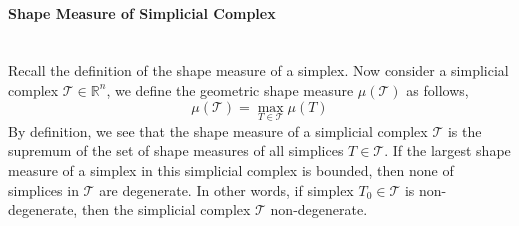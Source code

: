     \paragraph{Shape Measure of Simplicial Complex}\mbox{}\\
    Recall the definition of the shape measure of a simplex.
    Now consider a simplicial complex $\mathcal{T}\in\mathbb{R}^n$, we define the geometric shape measure $\mu(\mathcal{T})$ as follows,
    \begin{equation*}
    \mu(\mathcal{T}) = \max_{T \in \mathcal{T}} \mu(T)
    \end{equation*}
    By definition, we see that the shape measure of a simplicial complex $\mathcal{T}$ is the supremum of the set of shape measures of all simplices $T\in\mathcal{T}$. If the largest shape measure of a simplex in this simplicial complex is bounded, then none of simplices in $\mathcal{T}$ are degenerate. In other words, if simplex $T_0 \in\mathcal{T}$ is non-degenerate, then the simplicial complex $\mathcal{T}$ non-degenerate.
